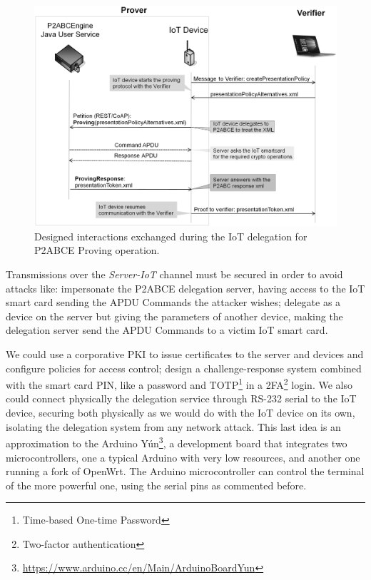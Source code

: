 \documentclass[journal]{IEEEtran}
\begin{document}
\begin{figure}[bth]
	\begin{center}
		\includegraphics[width=0.9\linewidth]{gfx/UML/DelegationProving}
	\end{center}
	\caption{Designed interactions exchanged during the IoT delegation for P2ABCE Proving operation.}
	\label{fig:DelegationProving}
\end{figure}

Transmissions over the \textit{Server-IoT} channel must be secured in order to avoid attacks like: impersonate the P2ABCE delegation server, having access to the IoT smart card sending the APDU Commands the attacker wishes; delegate as a device on the server but giving the parameters of another device, making the delegation server send the APDU Commands to a victim IoT smart card.


We could use a corporative PKI to issue certificates to the server and devices and configure policies for access control; design a challenge-response system combined with the smart card PIN, like a password and TOTP\footnote{Time-based One-time Password} in a 2FA\footnote{Two-factor authentication} login. We also could connect physically the delegation service through RS-232 serial to the IoT device, securing both physically as we would do with the IoT device on its own, isolating the delegation system from any network attack. This last idea is an approximation to the Arduino Y\'un\footnote{\url{https://www.arduino.cc/en/Main/ArduinoBoardYun}}, a development board that integrates two microcontrollers, one a typical Arduino with very low resources, and another one running a fork of OpenWrt. The Arduino microcontroller can control the terminal of the more powerful one, using the serial pins as commented before.
\end{document}
